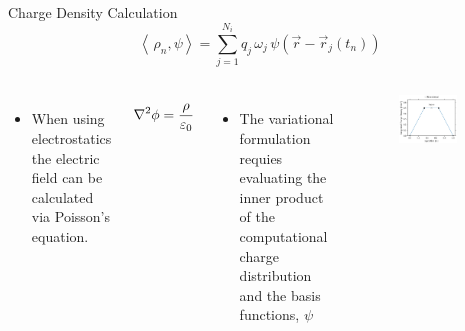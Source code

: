 \documentclass[aspectratio=169, 16pt]{beamer}
\begin{document}
\begin{frame}{Charge Density Calculation}
    \vspace{1cm}
    \begin{equation}
      \left< \, 
      \rho_n, 
      \psi
      \right> 
      = 
      \sum_{j=1}^{N_i} 
      q_j\,
      \omega_j\,
      \psi
      \left( \vec{r} - \vec{r}_j(t_n)
      \right) 
    \end{equation}
    \vspace{-0.25cm}
  \begin{columns}
    \begin{itemize}
      \item When using electrostatics the electric field can be calculated via Poisson's equation.
    \end{itemize}
    \begin{align*}
      \laplacian \phi = \frac{ \rho }{ \varepsilon_0 }
    \end{align*}
    \begin{itemize}
      \item The variational formulation requies evaluating the inner product of the computational charge distribution and the basis functions, $\psi$
    \end{itemize}
    \begin{figure}[H]
      \centering 
      \includegraphics[width=0.8\textwidth]{figs/charge_1D.png}
    \end{figure}
  \end{columns}
\end{frame}
\end{document}
